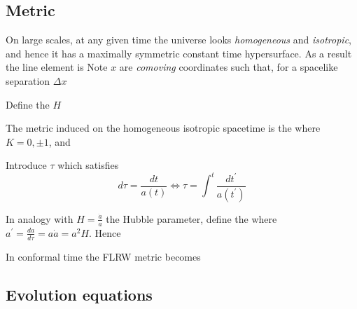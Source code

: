 \documentclass{article}
\begin{document}
\subsection{Metric}
On large scales, at any given time the universe looks \emph{homogeneous} and \emph{isotropic}, and hence it has a maximally symmetric constant time hypersurface. As a result the line element is 
Note $x$ are \emph{comoving} coordinates such that, for a spacelike separation $\Delta x$

\begin{definition}
Define the  $H$
\end{definition}

\begin{definition}
The metric induced on the homogeneous isotropic spacetime is the  
where $K = 0, \pm1$, and 
\end{definition}

\begin{definition}
Introduce  $\tau$ which satisfies 
\[
d\tau = \frac{dt}{a(t)} \Leftrightarrow \tau = \int^t \frac{dt^\prime}{a(t^\prime)}
\]
\end{definition}

\begin{definition}
In analogy with $H = \frac{\dot{a}}{a}$ the Hubble parameter, define the 
where $a^\prime = \frac{da}{d\tau} = a \dot{a}=a^2 H$. Hence 
\end{definition}

In conformal time the FLRW metric becomes 

\subsection{Evolution equations}
\end{document}
